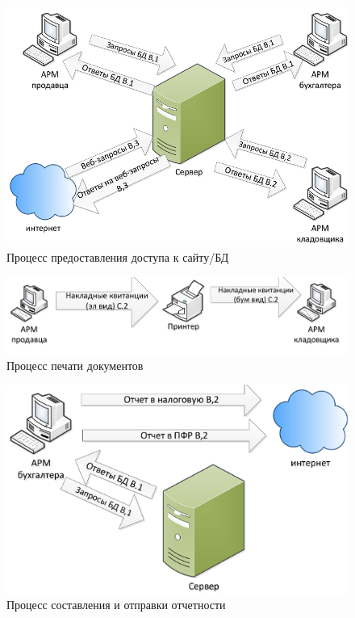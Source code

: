 \begin{figure}[H]
  \centering
  \includegraphics[width=\linewidth]{sec1/img/a3.png}
  \caption{Процесс предоставления доступа к сайту/БД}
  \label{fig:a3}
\end{figure}


\begin{figure}[H]
  \centering
  \includegraphics[width=\linewidth]{sec1/img/a4.png}
  \caption{Процесс печати документов}
  \label{fig:a4}
\end{figure}

\begin{figure}[H]
  \centering
  \includegraphics[width=\linewidth]{sec1/img/a5.png}
  \caption{Процесс составления и отправки отчетности}
  \label{fig:a5}
\end{figure}

